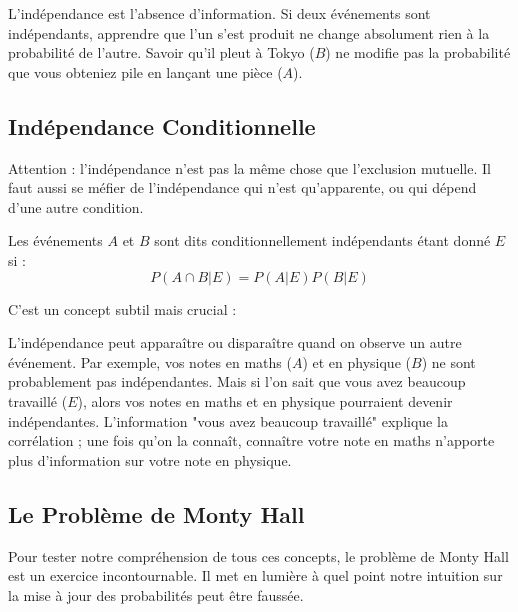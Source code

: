 \begin{intuitionbox}
L'indépendance est l'absence d'information. Si deux événements sont indépendants, apprendre que l'un s'est produit ne change absolument rien à la probabilité de l'autre. Savoir qu'il pleut à Tokyo ($B$) ne modifie pas la probabilité que vous obteniez pile en lançant une pièce ($A$).
\end{intuitionbox}

\subsection{Indépendance Conditionnelle}

Attention : l'indépendance n'est pas la même chose que l'exclusion mutuelle. Il faut aussi se méfier de l'indépendance qui n'est qu'apparente, ou qui dépend d'une autre condition.

\begin{definitionbox}
Les événements $A$ et $B$ sont dits conditionnellement indépendants étant donné $E$ si :
$$P(A \cap B | E) = P(A|E)P(B|E)$$
\end{definitionbox}

C'est un concept subtil mais crucial :

\begin{intuitionbox}
L'indépendance peut apparaître ou disparaître quand on observe un autre événement. Par exemple, vos notes en maths ($A$) et en physique ($B$) ne sont probablement pas indépendantes. Mais si l'on sait que vous avez beaucoup travaillé ($E$), alors vos notes en maths et en physique pourraient devenir indépendantes. L'information "vous avez beaucoup travaillé" explique la corrélation ; une fois qu'on la connaît, connaître votre note en maths n'apporte plus d'information sur votre note en physique.
\end{intuitionbox}

\subsection{Le Problème de Monty Hall}

Pour tester notre compréhension de tous ces concepts, le problème de Monty Hall est un exercice incontournable. Il met en lumière à quel point notre intuition sur la mise à jour des probabilités peut être faussée.

